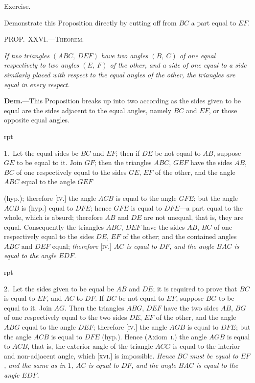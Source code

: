 \documentclass[oneside]{book}
\newcounter{wrapwidth}
\newcommand\mypropl[2]{
\bigskip\Needspace*{4\baselineskip}\begin{center}\textsc{#1}\end{center}
\hspace{\parindent}\emph{#2}\par\medskip
}
\newcommand\exhead[1]{
\Needspace*{5\baselineskip}\begin{center}
\textsf{#1}
\end{center}
}
\newcommand\imgflow[3]{
\setcounter{wrapwidth}{#1}

\begin{wrapfigure}[#2]{r}{\value{wrapwidth}pt}
\begin{center}
\vspace{-0.3in}

\end{center}
\end{wrapfigure}
}
\begin{document}
\exhead{Exercise.}

\begin{footnotesize}
Demonstrate this Proposition directly by cutting off from $BC$
a part equal to $EF$.
\par\end{footnotesize}


\mypropl{PROP\@.~XXVI\@.---Theorem.}{If two triangles $(ABC,\ DEF)$ have two angles $(B,\ C)$
of one equal respectively to two angles $(E,\ F)$ of the other,
and a side of one equal to a side similarly placed with
respect to the equal angles of the other, the triangles are
equal in every respect.}

\textbf{Dem.}---This Proposition breaks up into two according
as the sides given to be equal are the sides adjacent
to the equal angles, namely $BC$ and $EF$, or those
opposite equal angles.


\imgflow{140}{9}{f044}

1.~Let the equal sides be $BC$ and $EF$; then if $DE$ be
not equal to $AB$, suppose $GE$ to be equal to it. Join
$GF$; then the triangles $ABC$, $GEF$ have the sides $AB$,
$BC$ of one respectively equal to the sides $GE$, $EF$ of
the other, and the angle $ABC$ equal to the angle $GEF$

(hyp.); therefore [\textsc{iv}.] the angle $ACB$ is equal to the
angle $GFE$; but the angle
$ACB$ is (hyp.) equal to
$DFE$; hence $GFE$ is equal
to $DFE$---a part equal to
the whole, which is absurd;
therefore $AB$ and $DE$ are
not unequal, that is, they
are equal.  Consequently
the triangles $ABC$, $DEF$
have the sides $AB$, $BC$ of one respectively equal to the
sides $DE$, $EF$ of the other; and the contained angles
$ABC$ and $DEF$ equal; \emph{therefore} [\textsc{iv}.] \emph{$AC$ is equal to
$DF$, and the angle $BAC$ is equal to the angle $EDF$.}


\imgflow{160}{9}{f045}

2.~Let the sides given to be equal be $AB$ and $DE$; 
it is required to prove that
$BC$ is equal to $EF$, and
$AC$ to $DF$. If $BC$ be
not equal to $EF$, suppose
$BG$ to be equal to it.
Join $AG$. Then the triangles
$ABG$, $DEF$ have
the two sides $AB$, $BG$
of one respectively equal
to the two sides $DE$, $EF$ of the other, and the angle
$ABG$ equal to the angle $DEF$; therefore [\textsc{iv}.] the
angle $AGB$ is equal to $DFE$; but the angle $ACB$ is
equal to $DFE$ (hyp.). Hence (Axiom~\textsc{i}.) the angle
$AGB$ is equal to $ACB$, that is, the exterior angle of
the triangle $ACG$ is equal to the interior and non-adjacent
angle, which [\textsc{xvi}.] is impossible. \emph{Hence $BC$
must be equal to $EF$, and the same as in $1$, $AC$ is equal
to $DF$, and the angle $BAC$ is equal to the angle $EDF$.}\par\medskip
\end{document}
